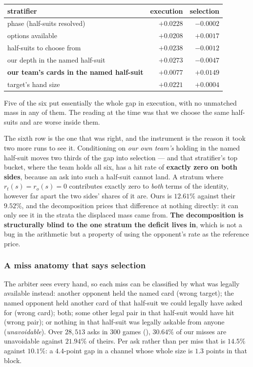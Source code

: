 \documentclass[11pt,letterpaper]{article}
\begin{document}
\begin{center}
\small
\begin{tabular}{lrr}
\toprule
stratifier & execution & selection \\
\midrule
phase (half-suits resolved) & $+0.0228$ & $-0.0002$ \\
options available & $+0.0208$ & $+0.0017$ \\
half-suits to choose from & $+0.0238$ & $-0.0012$ \\
our depth in the named half-suit & $+0.0273$ & $-0.0047$ \\
\textbf{our team's cards in the named half-suit} & $+0.0077$ & $\mathbf{+0.0149}$ \\
target's hand size & $+0.0221$ & $+0.0004$ \\
\bottomrule
\end{tabular}
\end{center}

\noindent Five of the six put essentially the whole gap in execution, with no
unmatched mass in any of them. The reading at the time was that we choose the
same half-suits and are worse inside them.

The sixth row is the one that was right, and the instrument is the reason it
took two more runs to see it. Conditioning on \emph{our own team's} holding in
the named half-suit moves two thirds of the gap into selection --- and that
stratifier's top bucket, where the team holds all six, has a hit rate of
\textbf{exactly zero on both sides}, because an ask into such a half-suit
cannot land. A stratum where $r_t(s) = r_o(s) = 0$ contributes exactly zero to
\emph{both} terms of the identity, however far apart the two sides' shares of
it are. Ours is $12.61\%$ against their $9.52\%$, and the decomposition prices
that difference at nothing directly: it can only see it in the strata the
displaced mass came from. \textbf{The decomposition is structurally blind to
the one stratum the deficit lives in}, which is not a bug in the arithmetic but
a property of using the opponent's rate as the reference price.

\subsubsection{A miss anatomy that says selection}

The arbiter sees every hand, so each miss can be classified by what was legally
available instead: another opponent held the named card (wrong target); the
named opponent held another card of that half-suit we could legally have asked
for (wrong card); both; some other legal pair in that half-suit would have hit
(wrong pair); or nothing in that half-suit was legally askable from anyone
(\emph{unavoidable}). Over $28{,}513$ asks in $300$ games
(), $30.64\%$ of our misses are unavoidable
against $21.94\%$ of theirs. Per ask rather than per miss that is $14.5\%$
against $10.1\%$: a $4.4$-point gap in a channel whose whole size is $1.3$
points in that block.
\end{document}

